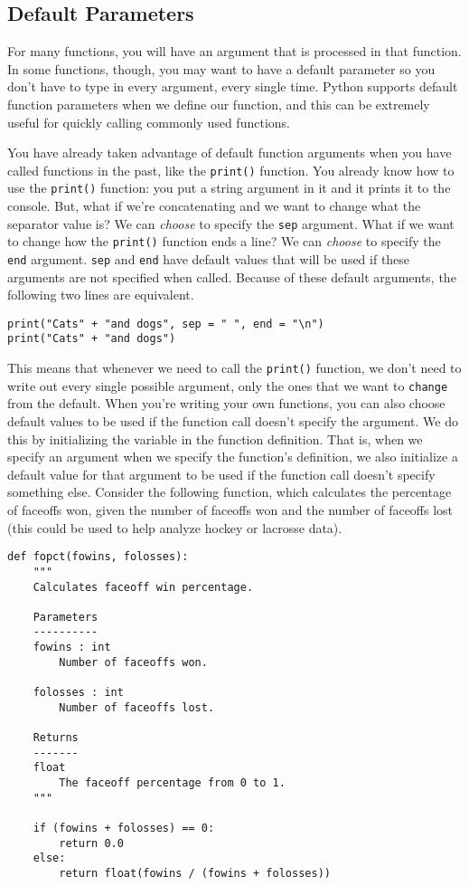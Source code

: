 \subsection{Default Parameters}
For many functions, you will have an argument that is processed in that function. In some functions, though, you may want to have a default parameter so you don't have to type in every argument, every single time. Python supports default function parameters when we define our function, and this can be extremely useful for quickly calling commonly used functions.\par
You have already taken advantage of default function arguments when you have called functions in the past, like the \verb|print()| function. You already know how to use the \verb|print()| function: you put a string argument in it and it prints it to the console. But, what if we're concatenating and we want to change what the separator value is? We can \textit{choose} to specify the \verb|sep| argument. What if we want to change how the \verb|print()| function ends a line? We can \textit{choose} to specify the \verb|end| argument. \verb|sep| and \verb|end| have default values that will be used if these arguments are not specified when called. Because of these default arguments, the following two lines are equivalent.\par
\begin{lstlisting}[style=pippython]
print("Cats" + "and dogs", sep = " ", end = "\n")
print("Cats" + "and dogs")
\end{lstlisting}
This means that whenever we need to call the \verb|print()| function, we don't need to write out every single possible argument, only the ones that we want to \verb|change| from the default. When you're writing your own functions, you can also choose default values to be used if the function call doesn't specify the argument. We do this by initializing the variable in the function definition. That is, when we specify an argument when we specify the function's definition, we also initialize a default value for that argument to be used if the function call doesn't specify something else. Consider the following function, which calculates the percentage of faceoffs won, given the number of faceoffs won and the number of faceoffs lost (this could be used to help analyze hockey or lacrosse data).\par
\begin{lstlisting}[style=pippython]
def fopct(fowins, folosses):
	"""
	Calculates faceoff win percentage.
	
	Parameters
	----------
	fowins : int
		Number of faceoffs won.

	folosses : int
		Number of faceoffs lost.

	Returns
	-------
	float
		The faceoff percentage from 0 to 1.
	"""
	
	if (fowins + folosses) == 0:
		return 0.0
	else:
		return float(fowins / (fowins + folosses))
\end{lstlisting}

